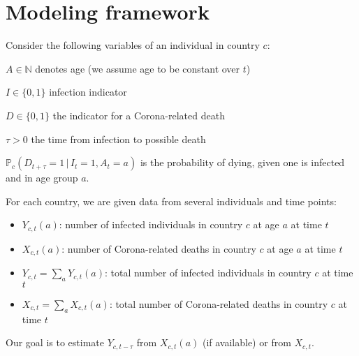 \documentclass[a4paper]{article}
\newcommand\N{\mathbb{N}}
\renewcommand\P{\mathbb{P}}
\newcommand{\given}{\, \vert \,}
\begin{document}
\section{Modeling framework}
Consider the following variables of an individual in country $c$: 
\begin{compactitem}
\item $A \in \N$ denotes age (we assume age to be constant over $t$)
\item $I \in \{0,1\}$ infection indicator
\item $D \in \{0,1\}$ the indicator for a Corona-related death 
\item $\tau > 0$ the time from infection to possible death
\item $\P_c(D_{t+\tau} = 1 \given I_t = 1, A_t = a)$ is the probability of dying, given one is infected and in age group $a$.
\end{compactitem}



For each country, we are given data from several individuals and time points:

\begin{itemize}
\item $Y_{c,t}(a)$: number of infected individuals in country $c$ at age $a$ at time $t$
\item $X_{c,t}(a)$: number of Corona-related deaths in country $c$ at age $a$ at time $t$
\item $Y_{c,t} = \sum_a Y_{c,t}(a)$: total number of infected individuals in country $c$ at time $t$
\item $X_{c,t} = \sum_a X_{c,t}(a)$: total number of Corona-related deaths in country $c$ at time $t$
\end{itemize}
%
Our goal is to estimate $Y_{c,t-\tau}$ from $X_{c,t}(a)$ (if available) or from $X_{c,t}$. 
\end{document}
